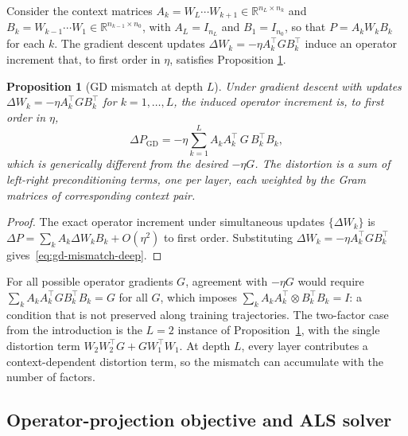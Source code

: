 \documentclass{article}
\newtheorem{proposition}[theorem]{Proposition}
\newcommand{\R}{\mathbb{R}}
\begin{document}
Consider the context matrices
  $A_k = W_L \cdots W_{k+1} \in \R^{n_L \times n_k}$ and 
$ B_k = W_{k-1} \cdots W_1 \in \R^{n_{k-1} \times n_0}$,
with $A_L = I_{n_L}$ and $B_1 = I_{n_0}$, so that $P = A_k W_k B_k$ for
each $k$.
The gradient descent updates $\Delta W_k = -\eta A_k^\top G B_k^\top$
induce an operator increment that, to first order in $\eta$, satisfies Proposition \ref{prop:gd-mismatch-deep}. 

\begin{proposition}[GD mismatch at depth $L$]
\label{prop:gd-mismatch-deep}
Under gradient descent with updates $\Delta W_k = -\eta A_k^\top G B_k^\top$
for $k = 1, \dots, L$, the induced operator increment is, to first order in
$\eta$,
\begin{equation}
  \Delta P_{\mathrm{GD}}
  = -\eta \sum_{k=1}^{L} A_k A_k^\top\, G\, B_k^\top B_k,
  \label{eq:gd-mismatch-deep}
\end{equation}
which is generically different from the desired $-\eta G$.
The distortion is a sum of left-right preconditioning terms, one per layer,
each weighted by the Gram matrices of corresponding context pair.
\end{proposition}
\begin{proof}
The exact operator increment under simultaneous updates $\{\Delta W_k\}$ is
$\Delta P = \sum_k A_k \Delta W_k B_k + O(\eta^2)$ to first order.
Substituting $\Delta W_k = -\eta A_k^\top G B_k^\top$ gives~\eqref{eq:gd-mismatch-deep}.
\end{proof}

For all possible operator gradients $G$, agreement with $-\eta G$ would require
$\sum_k A_k A_k^\top G B_k^\top B_k = G$ for all $G$, which imposes
$\sum_k A_k A_k^\top \otimes B_k^\top B_k = I$: a condition that is not
preserved along training trajectories.
The two-factor case from the introduction is the $L = 2$ instance of
Proposition~\ref{prop:gd-mismatch-deep}, with the single distortion term
$W_2 W_2^\top G + G W_1^\top W_1$.
At depth $L$, every layer contributes a context-dependent distortion term, so
the mismatch can accumulate with the number of factors.

\subsection{Operator-projection objective and ALS solver}
\label{sec:als}
\end{document}
